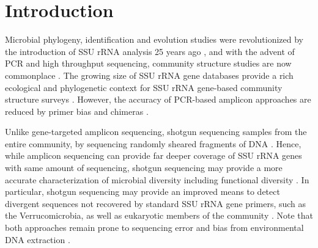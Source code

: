 \documentclass[]{msu-thesis}
\begin{document}
\section{Introduction}

Microbial phylogeny, identification and evolution studies were revolutionized by the introduction of SSU rRNA analysis 25 years ago \cite{lane_rapid_1985}, and with the advent of PCR and high throughput sequencing, community structure studies are now commonplace \cite{streit_metagenomicskey_2004,huse_exploring_2008,caporaso_ultra-high-throughput_2012,sogin_microbial_2006}. The growing size of SSU rRNA gene databases provide a rich ecological and phylogenetic context for SSU rRNA gene-based community structure surveys \cite{cole_ribosomal_2009,quast_silva_2013}. However, the accuracy of PCR-based amplicon approaches are reduced by primer bias and chimeras \cite{bergmann_under-recognized_2011,haas_chimeric_2011}.

Unlike gene-targeted amplicon sequencing, shotgun sequencing samples from the entire community, by sequencing randomly sheared fragments of DNA \cite{tyson_community_2004,qin_human_2010}. Hence, while amplicon sequencing can provide far deeper coverage of SSU rRNA genes with same amount of sequencing, shotgun sequencing may provide a more accurate characterization of microbial diversity including functional diversity \cite{shakya_comparative_2013}. In particular, shotgun sequencing may provide an improved means to detect divergent sequences not recovered by standard SSU rRNA gene primers, such as the Verrucomicrobia, as well as eukaryotic members of the community \cite{bergmann_under-recognized_2011,shakya_comparative_2013,baker_review_2003,frank_critical_2008}. Note that both approaches remain prone to sequencing error and bias from environmental DNA extraction \cite{haas_chimeric_2011}.
\end{document}
